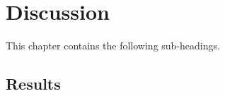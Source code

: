\chapter{Discussion}
\label{cha:discussion}

%
%











This chapter contains the following sub-headings.


\section{Results}
\label{sec:discussion-results}


